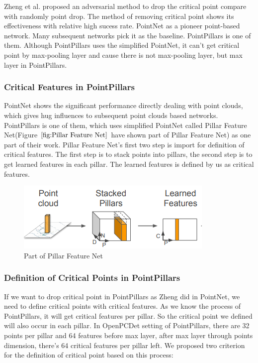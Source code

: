 Zheng et al.\cite{zheng_pointcloud_2019} proposed an adversarial method to drop the critical point compare with randomly point drop. The method of removing critical point shows its effectiveness with relative high sucess rate.
PointNet as a pioneer point-based network. Many subsequent networks pick it as the baseline. PointPillars\cite{lang_pointpillars_2019} is one of them. Although PointPillars uses the simplified PointNet, it can't get critical point by max-pooling layer and cause there is not max-pooling layer, but max layer in PointPillars.

\subsubsection{Critical Features in PointPillars}
 
PointNet shows the significant performance directly dealing with point clouds, which gives hug influences to subsequent point clouds based networks. PointPillars\cite{lang_pointpillars_2019} is one of them, which uses simplified PointNet\cite{qi_pointnet_2017} called Pillar Feature Net(Figure \(\ref{fig:Pillar Feature Net}\) have shown part of Pillar Feature Net) as one part of their work. Pillar Feature Net's first two step is import for definition of critical features. The first step is to stack points into pillars, the second step is to get learned features in each pillar. The learned features is defined by us as critical features.

\begin{figure}[!htbp]
\centering
\includegraphics[scale=1]{Graphics/Pillar Feature Net.png}
\caption{Part of Pillar Feature Net\cite{lang_pointpillars_2019}}
\label{fig:Pillar Feature Net}
\end{figure}

\subsubsection{Definition of Critical Points in PointPillars}
If we want to drop critical point in PointPillars as Zheng\cite{zheng_pointcloud_2019} did in PointNet, we need to define critical points with critical features. As we know the process of PointPillars, it will get critical features per pillar. So the critical point we defined will also occur in each pillar. In OpenPCDet setting of PointPillars, there are 32 points per pillar and 64 features before max layer, after max layer through points dimension, there's 64 critical features per pillar left. We proposed two criterion for the definition of critical point based on this process:


